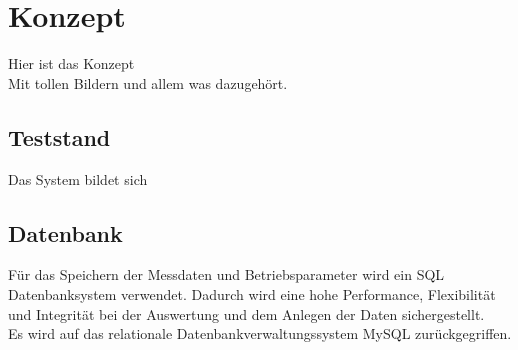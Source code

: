 \chapter{Konzept}
\label{chapter_Konzept}

Hier ist das Konzept\\
Mit tollen Bildern und allem was dazugehört.

\section{Teststand}
\label{section_Teststand}

Das System bildet sich 

\section{Datenbank}
\label{section_Datenbank}

Für das Speichern der Messdaten und Betriebsparameter wird ein \ac{SQL} Datenbanksystem verwendet. Dadurch wird eine hohe Performance, Flexibilität und Integrität bei der Auswertung und dem Anlegen der Daten sichergestellt.
\\

Es wird auf das relationale Datenbankverwaltungssystem MySQL zurückgegriffen.